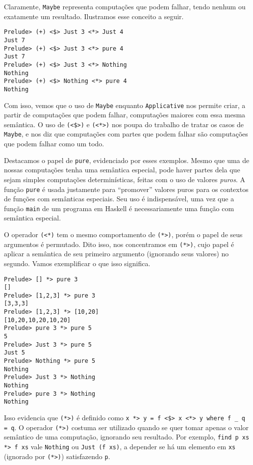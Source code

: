 \documentclass[a4paper]{article}
\begin{document}
Claramente, \texttt{Maybe} representa computações que podem falhar, tendo nenhum ou exatamente um resultado.
Ilustramos esse conceito a seguir.

\begin{verbatim}
Prelude> (+) <$> Just 3 <*> Just 4
Just 7
Prelude> (+) <$> Just 3 <*> pure 4
Just 7
Prelude> (+) <$> Just 3 <*> Nothing
Nothing
Prelude> (+) <$> Nothing <*> pure 4
Nothing
\end{verbatim}

Com isso, vemos que o uso de \texttt{Maybe} enquanto \texttt{Applicative} nos permite criar, a partir de computações que podem falhar, computações maiores com essa mesma semântica.
O uso de \texttt{(<\$>)} e \texttt{(<*>)} nos poupa do trabalho de tratar os casos de \texttt{Maybe}, e nos diz que computações com partes que podem falhar são computações que podem falhar como um todo.

Destacamos o papel de \texttt{pure}, evidenciado por esses exemplos.
Mesmo que uma de nossas computações tenha uma semântica especial, pode haver partes dela que sejam simples computações determinísticas, feitas com o uso de valores \emph{puros}.
A função \texttt{pure} é usada justamente para ``promover'' valores puros para os contextos de funções com semânticas especiais.
Seu uso é indispensável, uma vez que a função \texttt{main} de um programa em Haskell é necessariamente uma função com semântica especial.

O operador \texttt{(<*)} tem o mesmo comportamento de \texttt{(*>)}, porém o papel de seus argumentos é permutado.
Dito isso, nos concentramos em \texttt{(*>)}, cujo papel é aplicar a semântica de seu primeiro argumento (ignorando seus valores) no segundo.
Vamos exemplificar o que isso significa.

\begin{verbatim}
Prelude> [] *> pure 3
[]
Prelude> [1,2,3] *> pure 3
[3,3,3]
Prelude> [1,2,3] *> [10,20]
[10,20,10,20,10,20]
Prelude> pure 3 *> pure 5
5
Prelude> Just 3 *> pure 5
Just 5
Prelude> Nothing *> pure 5
Nothing
Prelude> Just 3 *> Nothing
Nothing
Prelude> pure 3 *> Nothing
Nothing
\end{verbatim}

Isso evidencia que \texttt{(*>)} é definido como \texttt{x *> y = f <\$> x <*> y where f \_ q = q}.
O operador \texttt{(*>)} costuma ser utilizado quando se quer tomar apenas o valor semântico de uma computação, ignorando seu resultado.
Por exemplo, \texttt{find p xs *> f xs} vale \texttt{Nothing} ou \texttt{Just (f xs)}, a depender se  há um elemento em \texttt{xs} (ignorado por \texttt{(*>)}) satisfazendo \texttt{p}.
\end{document}
